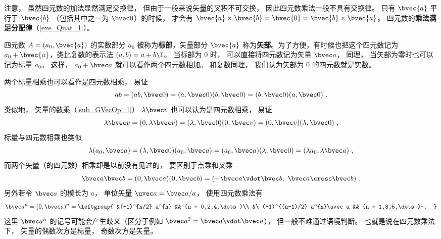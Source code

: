 注意， 虽然四元数的加法显然满足交换律， 但由于一般来说矢量的叉积不可交换， 因此四元数乘法一般不具有交换律。 只有 $\bvec{a}$ 平行于 $\bvec{b}$ （包括其中之一为 $\bvec 0$）的时候， 才会有 $\bvec{a}\times\bvec{b}= \bvec{0} =\bvec{b}\times\bvec{a}$。 四元数的\textbf{乘法满足分配律}（\autoref{exe_Quat_1}）。

四元数 $A=(a_0, \bvec{a})$ 的实数部分 $a_0$ 被称为\textbf{标部}，矢量部分 $\bvec{a}$ 称为\textbf{矢部}。为了方便，有时候也把这个四元数记为 $a_0+\bvec{a}$，类比复数的表示法 $(a, b)=a+b\I$。 当标部为 $0$ 时， 可以直接将四元数记为矢量 $\bvec a$， 同理， 当矢部为零时也可以记为标量 $a_0$。 这样， $a_0 + \bvec a$ 就可以看作两个四元数相加。 和复数同理， 我们认为矢部为 $0$ 的四元数就是实数。

\begin{example}{}
两个标量相乘也可以看作是四元数相乘， 易证
\begin{equation}
ab = (ab, \bvec 0) = (a,\bvec 0)(b,\bvec 0) = (b,\bvec 0)(a,\bvec 0)~.
\end{equation}
类似地， 矢量的数乘（\autoref{sub_GVecOp_1}） $\lambda\bvec v$ 也可以认为是四元数相乘， 易证
\begin{equation}
\lambda\bvec v = (0, \lambda\bvec v) = (\lambda, \bvec 0)(0, \bvec v) = (0, \bvec v)(\lambda, \bvec 0)~,
\end{equation}
标量与四元数相乘也类似
\begin{equation}
\lambda (a_0, \bvec a) = (\lambda,\bvec 0) (a_0, \bvec a) = (a_0, \bvec a)(\lambda,\bvec 0) = (\lambda a_0, \lambda\bvec a)~,
\end{equation}
而两个矢量（的四元数）相乘却是以前没有见过的， 要区别于点乘和叉乘
\begin{equation}
\bvec a\bvec b = (0, \bvec a)(0, \bvec b) = (-\bvec a\vdot\bvec b,\ \bvec a\cross\bvec b)~.
\end{equation}
另外若令 $\bvec a$ 的模长为 $a$， 单位矢量 $\uvec a = \bvec a/a$， 使用四元数乘法有
\begin{equation}
\bvec a^{n} = (0, \bvec a)^{n} =
\leftgroup{
&(-1)^{n/2} a^{n} && (n = 0,2,4,\dots)\\
&\ (-1)^{(n-1)/2} a^{n}\uvec a && (n = 1,3,5,\dots)~.
}
\end{equation}
这里 $\bvec a^{n}$ 的记号可能会产生歧义（区分于例如 $\bvec a^2 = \bvec a\vdot\bvec a$）， 但一般不难通过语境判断。 也就是说在四元数乘法下， 矢量的偶数次方是标量， 奇数次方是矢量。
\end{example}








